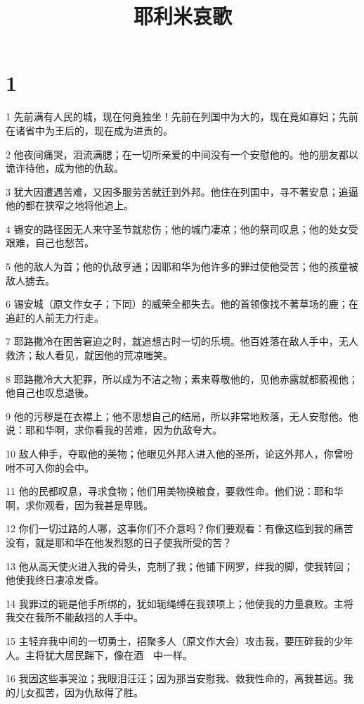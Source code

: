 

\title{耶利米哀歌}


\chapter{1}

\par 1 先前满有人民的城，现在何竟独坐！先前在列国中为大的，现在竟如寡妇；先前在诸省中为王后的，现在成为进贡的。
\par 2 他夜间痛哭，泪流满腮；在一切所亲爱的中间没有一个安慰他的。他的朋友都以诡诈待他，成为他的仇敌。
\par 3 犹大因遭遇苦难，又因多服劳苦就迁到外邦。他住在列国中，寻不著安息；追逼他的都在狭窄之地将他追上。
\par 4 锡安的路径因无人来守圣节就悲伤；他的城门凄凉；他的祭司叹息；他的处女受艰难，自己也愁苦。
\par 5 他的敌人为首；他的仇敌亨通；因耶和华为他许多的罪过使他受苦；他的孩童被敌人掳去。
\par 6 锡安城（原文作女子；下同）的威荣全都失去。他的首领像找不著草场的鹿；在追赶的人前无力行走。
\par 7 耶路撒冷在困苦窘迫之时，就追想古时一切的乐境。他百姓落在敌人手中，无人救济；敌人看见，就因他的荒凉嗤笑。
\par 8 耶路撒冷大大犯罪，所以成为不洁之物；素来尊敬他的，见他赤露就都藐视他；他自己也叹息退後。
\par 9 他的污秽是在衣襟上；他不思想自己的结局，所以非常地败落，无人安慰他。他说：耶和华啊，求你看我的苦难，因为仇敌夸大。
\par 10 敌人伸手，夺取他的美物；他眼见外邦人进入他的圣所，论这外邦人，你曾吩咐不可入你的会中。
\par 11 他的民都叹息，寻求食物；他们用美物换粮食，要救性命。他们说：耶和华啊，求你观看，因为我甚是卑贱。
\par 12 你们一切过路的人哪，这事你们不介意吗？你们要观看：有像这临到我的痛苦没有，就是耶和华在他发烈怒的日子使我所受的苦？
\par 13 他从高天使火进入我的骨头，克制了我；他铺下网罗，绊我的脚，使我转回；他使我终日凄凉发昏。
\par 14 我罪过的轭是他手所绑的，犹如轭绳缚在我颈项上；他使我的力量衰败。主将我交在我所不能敌挡的人手中。
\par 15 主轻弃我中间的一切勇士，招聚多人（原文作大会）攻击我，要压碎我的少年人。主将犹大居民踹下，像在酒　中一样。
\par 16 我因这些事哭泣；我眼泪汪汪；因为那当安慰我、救我性命的，离我甚远。我的儿女孤苦，因为仇敌得了胜。
